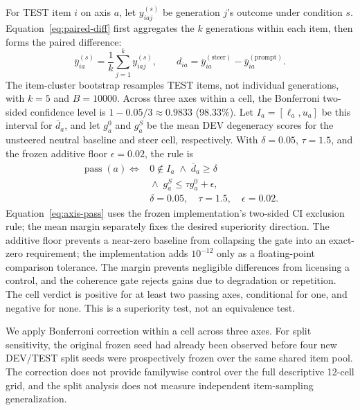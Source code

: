 \documentclass[sigconf]{acmart}
\begin{document}
For TEST item \(i\) on axis \(a\), let \(y^{(s)}_{iaj}\) be generation \(j\)'s outcome under condition \(s\). Equation~\ref{eq:paired-diff} first aggregates the \(k\) generations within each item, then forms the paired difference:
\begin{equation}
  \bar y^{(s)}_{ia}=\frac{1}{k}\sum_{j=1}^{k}y^{(s)}_{iaj},
  \qquad
  d_{ia}=\bar y^{(\mathrm{steer})}_{ia}
         -\bar y^{(\mathrm{prompt})}_{ia}.
  \label{eq:paired-diff}
\end{equation}
The item-cluster bootstrap resamples TEST items, not individual generations, with \(k=5\) and \(B=10000\). Across three axes within a cell, the Bonferroni two-sided confidence level is \(1-0.05/3\approx0.9833\) (98.33\%). Let \(I_a=[\ell_a,u_a]\) be this interval for \(\bar d_a\), and let \(g_a^0\) and \(g_a^S\) be the mean DEV degeneracy scores for the unsteered neutral baseline and steer cell, respectively. With \(\delta=0.05\), \(\tau=1.5\), and the frozen additive floor \(\epsilon=0.02\), the rule is
\begin{equation}
  \begin{aligned}
    \operatorname{pass}(a)\iff{}&
      0\notin I_a
      \;\land\;
      \bar d_a\ge\delta\\
      &{}\land\;
      g_a^S\le\tau g_a^0+\epsilon,\\
    &\delta=0.05,\quad \tau=1.5,\quad \epsilon=0.02.
  \end{aligned}
  \label{eq:axis-pass}
\end{equation}
Equation~\ref{eq:axis-pass} uses the frozen implementation's two-sided CI exclusion rule; the mean margin separately fixes the desired superiority direction. The additive floor prevents a near-zero baseline from collapsing the gate into an exact-zero requirement; the implementation adds \(10^{-12}\) only as a floating-point comparison tolerance. The margin prevents negligible differences from licensing a control, and the coherence gate rejects gains due to degradation or repetition. The cell verdict is positive for at least two passing axes, conditional for one, and negative for none. This is a superiority test, not an equivalence test.

We apply Bonferroni correction within a cell across three axes. For split sensitivity, the original frozen seed had already been observed before four new DEV/TEST split seeds were prospectively frozen over the same shared item pool. The correction does not provide familywise control over the full descriptive 12-cell grid, and the split analysis does not measure independent item-sampling generalization.
\end{document}
